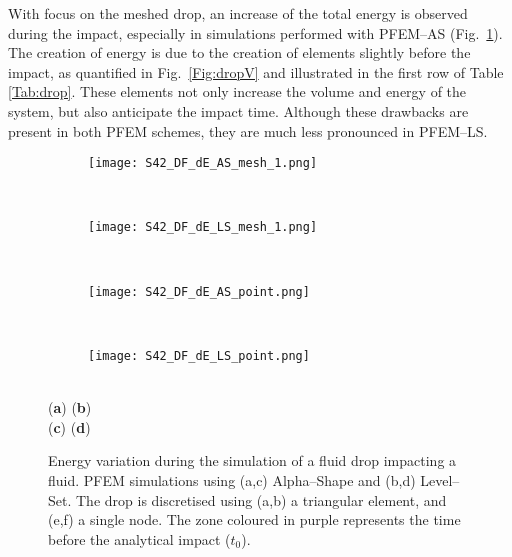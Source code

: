 \documentclass[final,3p,times]{elsarticle}
\begin{document}
With focus on the meshed drop, an increase of the total energy is observed during the impact, especially in simulations performed with PFEM--AS (Fig.~\ref{Fig:dropE_a}). The creation of energy is due to the creation of elements slightly before the impact, as quantified in Fig.~\ref{Fig:dropV} and illustrated in the first row of Table \ref{Tab:drop}. These elements not only increase the volume and energy of the system, but also anticipate the impact time. Although these drawbacks are present in both PFEM schemes, they are much less pronounced in PFEM--LS.


\begin{figure}[t!]
\captionsetup[subfigure]{labelformat=empty}
\centering 
	\begin{subfigure}[b]{0.48\textwidth}
		\texttt{[image: S42\_DF\_dE\_AS\_mesh\_1.png]}
		\caption{}
		\label{Fig:dropE_a}
	\end{subfigure}
	~
	\begin{subfigure}[b]{0.48\textwidth}	
		\texttt{[image: S42\_DF\_dE\_LS\_mesh\_1.png]}
		\caption{}
		\label{Fig:dropE_b}
	\end{subfigure}
	\vspace{-2mm}\\
	\begin{subfigure}[b]{0.48\textwidth}
		\texttt{[image: S42\_DF\_dE\_AS\_point.png]}
		\caption{}
		\label{Fig:dropE_e}
	\end{subfigure}
	~
	\begin{subfigure}[b]{0.48\textwidth}	
		\texttt{[image: S42\_DF\_dE\_LS\_point.png]}
		\caption{}
		\label{Fig:dropE_f}
	\end{subfigure}
	\\
	\vspace{-73mm}
	\hspace{-80mm} \footnotesize{(\textbf{a})} \hspace{75mm} (\textbf{b}) 
	\\
	\vspace{32mm}
	\hspace{-80mm} (\textbf{c}) \hspace{75mm} (\textbf{d})  
	\vspace{29mm}
\caption{Energy variation during the simulation of a fluid drop impacting a fluid. PFEM simulations using (a,c) Alpha--Shape and (b,d) Level--Set. The drop is discretised using (a,b) a triangular element, and (e,f) a single node. The zone coloured in purple represents the time before the analytical impact ($t_0$).}
\label{Fig:dropE}
\end{figure}
\end{document}
